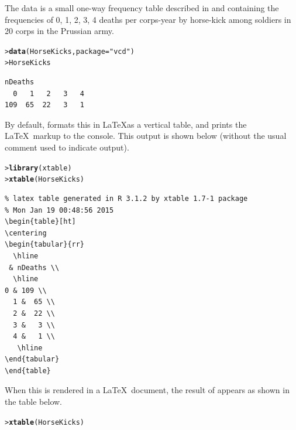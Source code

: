 \documentclass[10pt,krantz2]{krantz}\usepackage[]{graphicx}\usepackage[]{color}
\makeatletter
\newcommand{\hlstr}[1]{\textcolor[rgb]{0.192,0.494,0.8}{#1}}%
\newcommand{\hlstd}[1]{\textcolor[rgb]{0.345,0.345,0.345}{#1}}%
\newcommand{\hlkwc}[1]{\textcolor[rgb]{0.333,0.667,0.333}{#1}}%
\newcommand{\hlkwd}[1]{\textcolor[rgb]{0.737,0.353,0.396}{\textbf{#1}}}%
\newenvironment{kframe}{%
 \def\at@end@of@kframe{}%
 \ifinner\ifhmode%
  \def\at@end@of@kframe{\end{minipage}}%
  \begin{minipage}{\columnwidth}%
 \fi\fi%
 \def\FrameCommand##1{\hskip\@totalleftmargin \hskip-\fboxsep
 \colorbox{shadecolor}{##1}\hskip-\fboxsep
     \hskip-\linewidth \hskip-\@totalleftmargin \hskip\columnwidth}%
 \MakeFramed {\advance\hsize-\width
   \@totalleftmargin\z@ \linewidth\hsize
   \@setminipage}}%
 {\par\unskip\endMakeFramed%
 \at@end@of@kframe}
\newenvironment{knitrout}{}{} %
\renewenvironment{knitrout}{\small\renewcommand{\baselinestretch}{.85}}{} %
\makeatother
\begin{document}
The  data is a small one-way frequency table
described in  and containing the frequencies
of 0, 1, 2, 3, 4 deaths per corps-year by horse-kick among soldiers in 20 corps in
the Prussian army.
\begin{knitrout}
\color{fgcolor}\begin{kframe}
\begin{alltt}
\hlstd{> }\hlkwd{data}\hlstd{(HorseKicks,} \hlkwc{package} \hlstd{=} \hlstr{"vcd"}\hlstd{)}
\hlstd{> }\hlstd{HorseKicks}
\end{alltt}
\begin{verbatim}
nDeaths
  0   1   2   3   4 
109  65  22   3   1 
\end{verbatim}
\end{kframe}
\end{knitrout}
By default,  formats this in \LaTeX as a vertical table,
and prints the \LaTeX\ markup to the \R console.  This output is shown
below (without the usual \code{\#\#} comment used to indicate \R output).
\begin{knitrout}
\color{fgcolor}\begin{kframe}
\begin{alltt}
\hlstd{> }\hlkwd{library}\hlstd{(xtable)}
\hlstd{> }\hlkwd{xtable}\hlstd{(HorseKicks)}
\end{alltt}
\begin{verbatim}
% latex table generated in R 3.1.2 by xtable 1.7-1 package
% Mon Jan 19 00:48:56 2015
\begin{table}[ht]
\centering
\begin{tabular}{rr}
  \hline
 & nDeaths \\ 
  \hline
0 & 109 \\ 
  1 &  65 \\ 
  2 &  22 \\ 
  3 &   3 \\ 
  4 &   1 \\ 
   \hline
\end{tabular}
\end{table}
\end{verbatim}
\end{kframe}
\end{knitrout}
When this is rendered in a \LaTeX\ document, the result of 
appears as shown in the table below.
\begin{kframe}
\begin{alltt}
\hlstd{> }\hlkwd{xtable}\hlstd{(HorseKicks)}
\end{alltt}
\end{kframe}%
\end{document}
